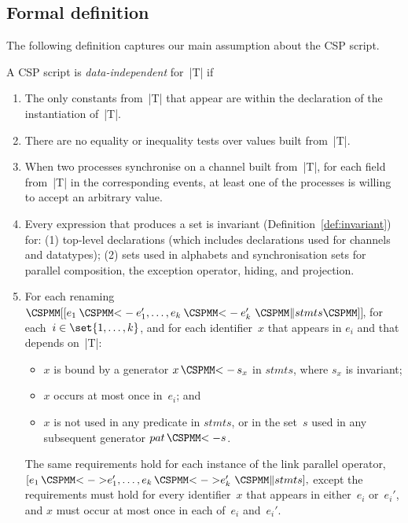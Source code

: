 
\subsection{Formal definition}

The following definition captures our main assumption about the CSP script.
%
\begin{definition}
\label{defn:data-independent}
A CSP script is \emph{data-independent} for~|T| if
\begin{enumerate}
\item The only constants from~|T| that appear are within the declaration
  of the instantiation of~|T|.

\item There are no equality or inequality tests over values built from~|T|.

\item\label{item:sync} When two processes synchronise on a channel built
  from~|T|, for each field from~|T| in the corresponding events, at least one
  of the processes is willing to accept an arbitrary value.

\item\label{item:di-invariant} Every expression that produces a set is
  invariant (Definition~\ref{def:invariant}) for: (1) top-level declarations
  (which includes declarations used for channels and datatypes); (2) sets used
  in alphabets and synchronisation sets for parallel composition, the
  exception operator,  hiding, and projection.

\item\label{item:di-renaming} For each renaming 
  \( \rename{e_1 \lArrow e_1', \ldots, e_k \lArrow e_k' ~ \M\| stmts} \),
  for each~$i \in \set{1,\ldots,k}$, and for each identifier~$x$ that appears
  in $e_i$ and that depends on~|T|:
%
  \begin{itemize}
  \item $x$ is bound by a generator $x \,\M{<-}\, s_x$ in $stmts$, where $s_x$
    is invariant; 

  \item $x$ occurs at most once in~$e_i$; and

  \item $x$ is not used in any predicate in $stmts$, or in the set~$s$ used in
  any subsequent generator $pat \,\M{<-} s$.
  \end{itemize}
%
  The same requirements hold for each instance of the link parallel operator,
  \( [ e_1 \,\M{<->} e_1', \ldots, e_k \,\M{<->} e_k' ~ \M\| stmts ], \)
  except the requirements must hold for every identifier~$x$ that appears in
  either~$e_i$ or~$e_i'$, and $x$ must occur at most once in each of~$e_i$
  and~$e_i'$.


\end{enumerate}
\end{definition}

